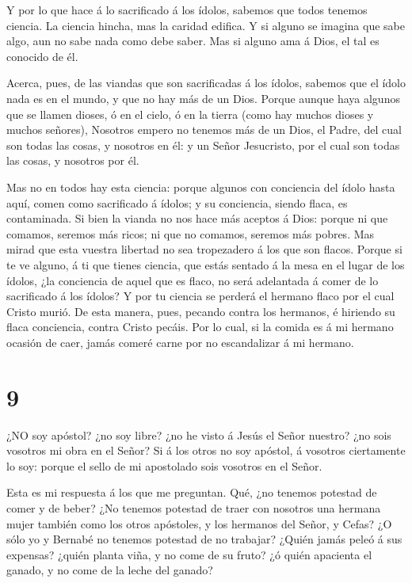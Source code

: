 Y por lo que hace á lo sacrificado á los ídolos, sabemos
que todos tenemos ciencia. La ciencia hincha, mas la caridad edifica.
 Y si alguno se imagina que sabe algo, aun no sabe nada como
debe saber.  Mas si alguno ama á Dios, el tal es conocido de
él.

 Acerca, pues, de las viandas que son sacrificadas á los
ídolos, sabemos que el ídolo nada es en el mundo, y que no hay más de un
Dios.  Porque aunque haya algunos que se llamen dioses, ó en
el cielo, ó en la tierra (como hay muchos dioses y muchos señores),
 Nosotros empero no tenemos más de un Dios, el Padre, del
cual son todas las cosas, y nosotros en él: y un Señor Jesucristo, por
el cual son todas las cosas, y nosotros por él.

 Mas no en todos hay esta ciencia: porque algunos con
conciencia del ídolo hasta aquí, comen como sacrificado á ídolos; y su
conciencia, siendo flaca, es contaminada.  Si bien la vianda
no nos hace más aceptos á Dios: porque ni que comamos, seremos más
ricos; ni que no comamos, seremos más pobres.  Mas mirad que
esta vuestra libertad no sea tropezadero á los que son flacos.
 Porque si te ve alguno, á ti que tienes ciencia, que estás
sentado á la mesa en el lugar de los ídolos, ¿la conciencia de aquel que
es flaco, no será adelantada á comer de lo sacrificado á los ídolos?
 Y por tu ciencia se perderá el hermano flaco por el cual
Cristo murió.  De esta manera, pues, pecando contra los
hermanos, é hiriendo su flaca conciencia, contra Cristo pecáis.
 Por lo cual, si la comida es á mi hermano ocasión de caer,
jamás comeré carne por no escandalizar á mi hermano.

\hypertarget{section-8}{%
\section{9}\label{section-8}}

 ¿NO soy apóstol? ¿no soy libre? ¿no he visto á Jesús el
Señor nuestro? ¿no sois vosotros mi obra en el Señor?  Si á
los otros no soy apóstol, á vosotros ciertamente lo soy: porque el sello
de mi apostolado sois vosotros en el Señor.

 Esta es mi respuesta á los que me preguntan. 
Qué, ¿no tenemos potestad de comer y de beber?  ¿No tenemos
potestad de traer con nosotros una hermana mujer también como los otros
apóstoles, y los hermanos del Señor, y Cefas?  ¿O sólo yo y
Bernabé no tenemos potestad de no trabajar?  ¿Quién jamás
peleó á sus expensas? ¿quién planta viña, y no come de su fruto? ¿ó
quién apacienta el ganado, y no come de la leche del ganado?


